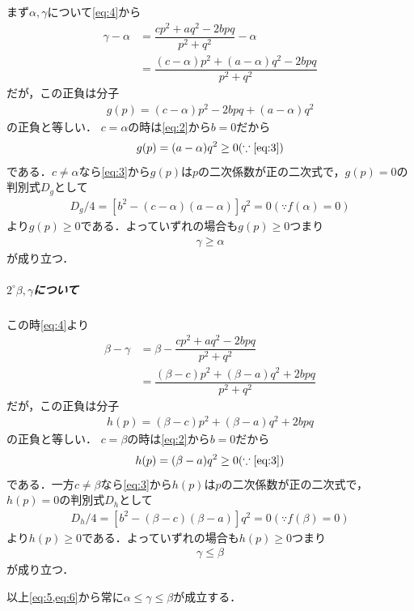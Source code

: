 \documentclass[../../main.tex]{subfiles}
\begin{document}
まず$\alpha,\gamma$について\cref{eq:4}から
\begin{align}
  \gamma - \alpha
  & = \dfrac{cp^2+aq^2-2bpq}{p^2+q^2} - \alpha \\
  & = \dfrac{(c-\alpha)p^2+(a-\alpha)q^2-2bpq}{p^2+q^2}
\end{align}
だが，この正負は分子
\begin{align}
  g(p) = (c-\alpha)p^2-2bpq + (a-\alpha)q^2
\end{align}
の正負と等しい．
$c=\alpha$の時は\cref{eq:2}から$b=0$だから
\begin{align}
  g(p) = (a-\alpha)q^2 \ge 0 (\because\text{\cref{eq:3}})
\end{align}
である．$c\neq \alpha$なら\cref{eq:3}から$g(p)$は$p$の二次係数が正の二次式で，$g(p)=0$の判別式$D_g$として
\begin{align}
  D_g/4 = [b^2 - (c-\alpha)(a-\alpha)]q^2 = 0 (\because f(\alpha)=0)
\end{align}
より$g(p) \ge 0$である．よっていずれの場合も$g(p)\ge0$つまり
\begin{align}
  \gamma \ge \alpha \label{eq:5}
\end{align}
が成り立つ．

\subparagraph{$2^{\circ} \beta,\gamma$について}

この時\cref{eq:4}より
\begin{align}
  \beta - \gamma
  & = \beta - \dfrac{cp^2+aq^2-2bpq}{p^2+q^2} \\
  & = \dfrac{(\beta - c)p^2+(\beta-a)q^2+2bpq}{p^2+q^2}
\end{align}
だが，この正負は分子
\begin{align}
  h(p) = (\beta - c)p^2+(\beta-a)q^2+2bpq
\end{align}
の正負と等しい．
$c=\beta$の時は\cref{eq:2}から$b=0$だから
\begin{align}
  h(p) = (\beta-a)q^2 \ge 0 (\because\text{\cref{eq:3}})
\end{align}
である．一方$c\neq \beta$なら\cref{eq:3}から$h(p)$は$p$の二次係数が正の二次式で，
$h(p)=0$の判別式$D_h$として
\begin{align}
  D_h/4 = [b^2 - (\beta - c)(\beta -a)]q^2 = 0 (\because f(\beta)=0)
\end{align}
より$h(p) \ge 0$である．よっていずれの場合も$h(p)\ge0$つまり
\begin{align}
  \gamma \le \beta \label{eq:6}
\end{align}
が成り立つ．
\casesend

以上\cref{eq:5,eq:6}から常に$\alpha \le \gamma \le \beta$が成立する．

\newpage
\end{document}

